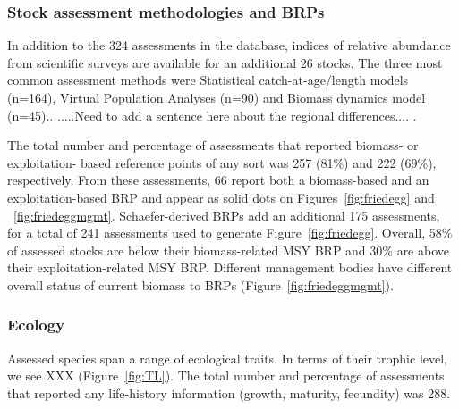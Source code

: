 \subsubsection*{Stock assessment methodologies and BRPs}
In addition to the 324 assessments in the
database, indices of relative abundance from scientific surveys are
available for an additional 26 stocks. The
three most common assessment methods were Statistical catch-at-age/length models (n=164),
Virtual Population Analyses (n=90) and Biomass dynamics model (n=45)..  .....Need
to add a sentence here about the regional differences.... .


The total number and percentage of assessments that reported biomass-
or exploitation- based reference points of any sort was
257 (81\%) and
222 (69\%),
respectively. From these assessments,
66 report both a biomass-based and an
exploitation-based BRP and appear as solid dots on
Figures~\ref{fig:friedegg} and ~\ref{fig:friedeggmgmt}. Schaefer-derived BRPs
add an additional 175 assessments, for
a total of 241 assessments used to generate
Figure~\ref{fig:friedegg}. Overall,
58\% of assessed stocks are below
their biomass-related MSY BRP and
30\% are above their
exploitation-related MSY BRP. Different management bodies have
different overall status of current biomass to BRPs
(Figure~\ref{fig:friedeggmgmt}).
 
\subsubsection*{Ecology}
Assessed species span a range of ecological traits. In terms of their
trophic level, we see XXX (Figure~\ref{fig:TL}). The total number and
percentage of assessments that reported any life-history information
(growth, maturity, fecundity) was 288.





